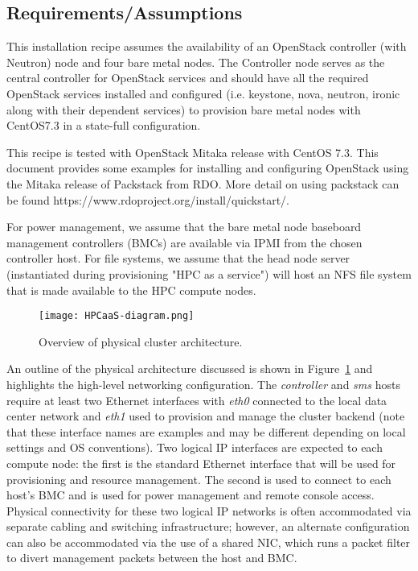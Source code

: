 \subsection{Requirements/Assumptions}

This installation recipe assumes the availability of an OpenStack controller (with Neutron) node and four bare metal nodes. The Controller node serves as the central controller for OpenStack services and should have all the required OpenStack services installed and configured (i.e. keystone, nova, neutron, ironic along with their dependent services) to provision bare metal nodes with CentOS7.3 in a state-full 
configuration. 

This recipe is tested with OpenStack Mitaka release with CentOS 7.3. This document provides some examples for installing and configuring OpenStack using the Mitaka release of Packstack from RDO. More detail on using packstack can be found https://www.rdoproject.org/install/quickstart/. 

For power management, we assume that the bare metal node baseboard management controllers (BMCs) are available via IPMI from the chosen controller host. For file systems, we assume that the head node server (instantiated during provisioning "HPC as a service") will host an NFS file system that is made available to the HPC compute nodes.



\begin{figure}[hbt]
\center
\texttt{[image: HPCaaS-diagram.png]}
\vspace*{-0.2cm}
\caption{Overview of physical cluster architecture.} \label{fig:physical_arch}
\end{figure}
\mbox{}

\vspace*{0.5cm}

An outline of the physical architecture discussed is shown in
Figure~\ref{fig:physical_arch} and highlights the high-level networking
configuration. The {\em controller} and {\em sms} hosts require at least two Ethernet interfaces with {\em eth0} connected to the local data center network and {\em eth1} used to provision and manage the cluster backend (note that these interface names are examples and may be different depending on local settings and OS conventions). Two logical IP interfaces are expected to each compute node: the first is the standard Ethernet interface that will be used for provisioning and resource management. The second is used to connect to each host's BMC and is used for power management and remote console access. Physical connectivity for these two logical IP networks is often accommodated via separate cabling and switching infrastructure; however, an alternate configuration can also be accommodated via the use of a shared NIC, which runs a packet filter to divert management packets between the host and BMC.

